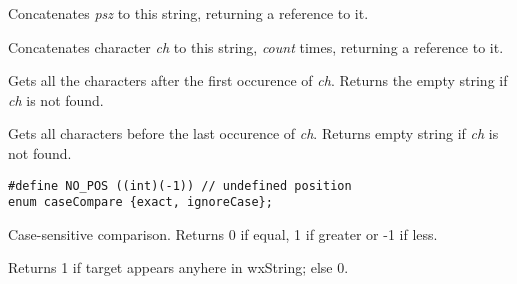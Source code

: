 \label{wxstringAppend}


Concatenates {\it psz} to this string, returning a reference to it.


Concatenates character {\it ch} to this string, {\it count} times, returning a reference
to it.

\label{wxstringAfter}


Gets all the characters after the first occurence of {\it ch}.
Returns the empty string if {\it ch} is not found.

\label{wxstringBefore}


Gets all characters before the last occurence of {\it ch}.
Returns empty string if {\it ch} is not found.

\label{wxstringCompareTo}

\begin{verbatim}
#define NO_POS ((int)(-1)) // undefined position
enum caseCompare {exact, ignoreCase};
\end{verbatim}
  

Case-sensitive comparison. Returns 0 if equal, 1 if greater or -1 if less.

\label{wxstringContains}


Returns 1 if target appears anyhere in wxString; else 0.

\label{wxstringisempty}


\label{wxstringfirst}





